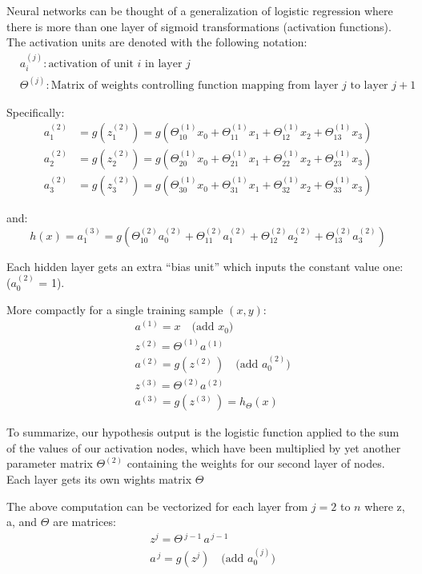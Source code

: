 \documentclass[12pt]{article}
\begin{document}
Neural networks can be thought of a generalization of logistic regression where there is more than one layer of sigmoid transformations (activation functions). The activation units are denoted with the following notation:
\begin{align*}
& a_i^{(j)}: \text{activation of unit } i \text{ in layer } j \\
& \Theta^{(j)}: \text{Matrix of weights controlling function mapping from layer  } j \text{ to layer } j+1
\end{align*}

Specifically:
\begin{align*}
a_1^{(2)} &= g(z_1^{(2)}) = g \left( \Theta_{10}^{(1)}x_0 + \Theta_{11}^{(1)}x_1 + \Theta_{12}^{(1)}x_2 + \Theta_{13}^{(1)}x_3   \right)\\
%
a_2^{(2)} &= g(z_2^{(2)}) = g \left( \Theta_{20}^{(1)}x_0 + \Theta_{21}^{(1)}x_1 + \Theta_{22}^{(1)}x_2 + \Theta_{23}^{(1)}x_3   \right)\\
%
a_3^{(2)} &= g(z_3^{(2)}) =g \left( \Theta_{30}^{(1)}x_0 + \Theta_{31}^{(1)}x_1 + \Theta_{32}^{(1)}x_2 + \Theta_{33}^{(1)}x_3   \right)
%
\end{align*}

and:
\[
h(x) = a_1^{(3)} = g \left( \Theta_{10}^{(2)}a_0^{(2)} + \Theta_{11}^{(2)}a_1^{(2)} + \Theta_{12}^{(2)}a_2^{(2)} + \Theta_{13}^{(2)}a_3^{(2)}   \right)
\]

Each hidden layer gets an extra ``bias unit'' which inputs the constant value one: ($a_0^{(2)}$ = 1).

More compactly for a single training sample $(x,y)$:
\begin{align}
& a^{(1)} = x \quad \text{(add $x_0$)} \\
& z^{(2)} = \Theta^{(1)} a^{(1)} \\
& a^{(2)} = g(z^{(2)}\, ) \quad \text{(add $a_0^{(2)}$)} \\
& z^{(3)} = \Theta^{(2)} a^{(2)} \\
& a^{(3)}  = g(z^{(3)}\,) = h_\Theta (x)
\end{align}


 
To summarize, our hypothesis output is the logistic function applied to the sum of the values of our activation nodes, which have been multiplied by yet another parameter matrix $\Theta^{(2)}$ containing the weights for our second layer of nodes. Each layer gets its own wights matrix $\Theta$

The above computation can be vectorized for each layer from $j=2$ to $n$ where z, a, and $\Theta$ are matrices:
\begin{align*}
& z^{j} = \Theta\,^{j-1} \, {a^{\,j-1}}  \,  \\
& a^{\, j} = g(z^{j}) \quad \text{(add $a_0^{(j)}$)}
\end{align*}
\end{document}
